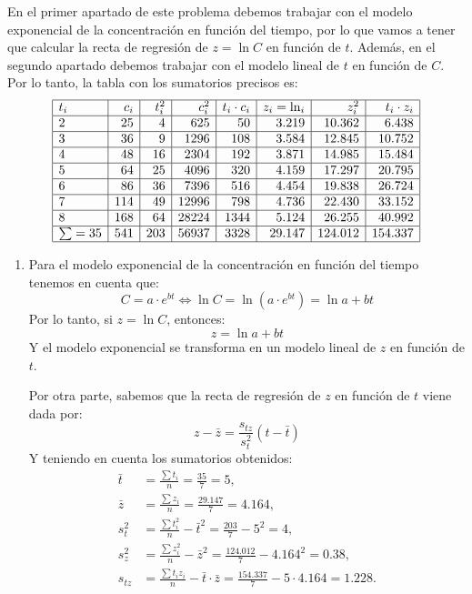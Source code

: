 {En el primer apartado de este problema debemos trabajar con el modelo exponencial de la concentración en función del
tiempo, por lo que vamos a tener que calcular la recta de regresión de $z=\ln C$ en función de $t$. Además, en el
segundo apartado debemos trabajar con el modelo lineal de $t$ en función de $C$. Por lo tanto, la tabla con los
sumatorios precisos es:
\[
\begin{array}{|l|r|r|r|r|r|r|r|}
\hline
t_i & c_i & t_i^2 & c_i^2 & t_i \cdot c_i & z_i=\ln_i & z_i^2 & t_i \cdot z_i \\
\hline
2 & 25 & 4 & 625 & 50 & 3.219 & 10.362 & 6.438 \\
\hline
3 & 36 & 9 & 1296 & 108 & 3.584 & 12.845 & 10.752 \\
\hline
4 & 48 & 16 & 2304 & 192 & 3.871 & 14.985 & 15.484 \\
\hline
5 & 64 & 25 & 4096 & 320 & 4.159 & 17.297 & 20.795 \\
\hline
6 & 86 & 36 & 7396 & 516 & 4.454 & 19.838 & 26.724 \\
\hline
7 & 114 & 49 & 12996 & 798 & 4.736 & 22.430 & 33.152 \\
\hline
8 & 168 & 64 & 28224 & 1344 & 5.124 & 26.255 & 40.992 \\
\hline
\sum= 35 & 541 & 203 & 56937 & 3328 & 29.147 & 124.012 & 154.337 \\
\hline
\end{array}
\]

\begin{enumerate}
\item Para el modelo exponencial de la concentración en función del tiempo tenemos en cuenta que:
\[
C = a \cdot e^{bt}  \Leftrightarrow \ln C = \ln \left( {a \cdot e^{bt} } \right) = \ln a + bt
\]
Por lo tanto, si $z=\ln C$, entonces:
\[
z=\ln a +bt
\]
Y el modelo exponencial se transforma en un modelo lineal de $z$ en función de $t$.

Por otra parte, sabemos que la recta de regresión de $z$ en función de $t$ viene dada por:
\[
z-\bar z = \frac{s_{tz}}{s_t^2}(t-\bar t)
\]
Y teniendo en cuenta los sumatorios obtenidos:
\begin{align*}
\bar t &= \frac{\sum t_i}{n} = \frac{35}{7} = 5,\\
\bar z &= \frac{\sum z_i}{n} = \frac{29.147}{7} = 4.164,\\
s_t ^2  &= \frac{\sum t_i^2}{n}-\bar t^2 = \frac{203}{7}-5^2 = 4,\\
s_z ^2  &= \frac{\sum z_i^2}{n}-\bar z^2 = \frac{124.012}{7}-4.164^2 = 0.38,\\
s_{tz}  &= \frac{\sum t_i z_i}{n}-\bar t \cdot \bar z = \frac{154.337}{7}-5 \cdot 4.164 = 1.228.
\end{align*}


\end{enumerate}}
